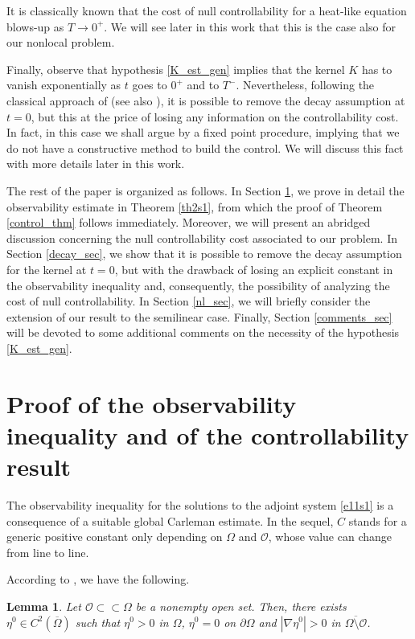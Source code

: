 \documentclass[preprint,1p]{elsarticle}
\newtheorem{lemma}{\bf Lemma}[section]
\begin{document}
It is classically known that the cost of null controllability for a heat-like equation blows-up as $T\to 0^+$. We will see later in this work that this is the case also for our nonlocal problem.

Finally, observe that hypothesis \eqref{K_est_gen} implies that the kernel $K$ has to vanish exponentially as $t$ goes to $0^+$ and to $T^-$. Nevertheless, following the classical approach of \cite{fernandez2004local} (see also \cite{tao2016null}), it is possible to remove the decay assumption at $t=0$, but this at the price of losing any information on the controllability cost. In fact, in this case we shall argue by a fixed point procedure, implying that we do not have a constructive method to build the control. We will discuss this fact with more details later in this work.  

The rest of the paper is organized as follows. In Section \ref{obs_sec}, we prove in detail the observability estimate in Theorem \ref{th2s1}, from which the proof of Theorem \ref{control_thm} follows immediately. Moreover, we will present an abridged discussion concerning the null controllability cost associated to our problem. In Section \ref{decay_sec}, we show that it is possible to remove the decay assumption for the kernel at $t=0$, but with the drawback of losing an explicit constant in the observability inequality and, consequently, the possibility of analyzing the cost of null controllability. In Section \ref{nl_sec}, we will briefly consider the extension of our result to the semilinear case. Finally, Section \ref{comments_sec} will be devoted to some additional comments on the necessity of the hypothesis \eqref{K_est_gen}.

\section{Proof of the observability inequality and of the controllability result}\label{obs_sec}
The observability inequality for the solutions to the adjoint system \eqref{e11s1} is a consequence of a suitable global Carleman estimate. In the sequel, $C$ stands for a generic positive constant only depending on $\Omega$ and ${\mathcal O}$, whose value can change from line to line.

According to \cite[Lemma 1.1]{fursikov1996controllability}, we have the following. 

\begin{lemma}
Let $\mathcal O\subset\subset \Omega$ be a nonempty open set. Then, there exists $\eta^0\in C^2(\overline{\Omega})$ such that $\eta^0>0$ in $\Omega$, $\eta^0=0$ on $\partial\Omega$ and $|\nabla\eta^0|> 0$ in $\overline{\Omega\setminus{ \mathcal O}}$.
\end{lemma}
\end{document}
